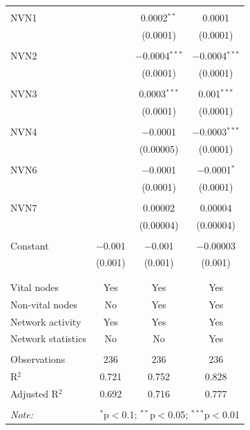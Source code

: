\begin{table}[!htbp]
\begin{tabular}{@{\extracolsep{5pt}}lccc}
  & & & \\ 
 NVN1 &  & 0.0002$^{**}$ & 0.0001 \\ 
  &  & (0.0001) & (0.0001) \\ 
  & & & \\ 
 NVN2 &  & $-$0.0004$^{***}$ & $-$0.0004$^{***}$ \\ 
  &  & (0.0001) & (0.0001) \\ 
  & & & \\ 
 NVN3 &  & 0.0003$^{***}$ & 0.001$^{***}$ \\ 
  &  & (0.0001) & (0.0001) \\ 
  & & & \\ 
 NVN4 &  & $-$0.0001 & $-$0.0003$^{***}$ \\ 
  &  & (0.00005) & (0.0001) \\ 
  & & & \\ 
 NVN6 &  & $-$0.0001 & $-$0.0001$^{*}$ \\ 
  &  & (0.0001) & (0.0001) \\ 
  & & & \\ 
 NVN7 &  & 0.00002 & 0.00004 \\ 
  &  & (0.00004) & (0.00004) \\ 
  & & & \\ 
 Constant & $-$0.001 & $-$0.001 & $-$0.00003 \\ 
  & (0.001) & (0.001) & (0.001) \\ 
  & & & \\ 
\hline \\[-1.8ex] 
Vital nodes & Yes & Yes & Yes \\ 
Non-vital nodes & No & Yes & Yes \\ 
Network activity & Yes & Yes & Yes \\ 
Network statistics & No & No & Yes \\ 
\hline &  &  &  \\ 
Observations & 236 & 236 & 236 \\ 
R$^{2}$ & 0.721 & 0.752 & 0.828 \\ 
Adjusted R$^{2}$ & 0.692 & 0.716 & 0.777 \\ 
\hline 
\hline \\[-1.8ex] 
\textit{Note:}  & \multicolumn{3}{r}{$^{*}$p$<$0.1; $^{**}$p$<$0.05; $^{***}$p$<$0.01} \\ 
\end{tabular} 
\end{table} 
